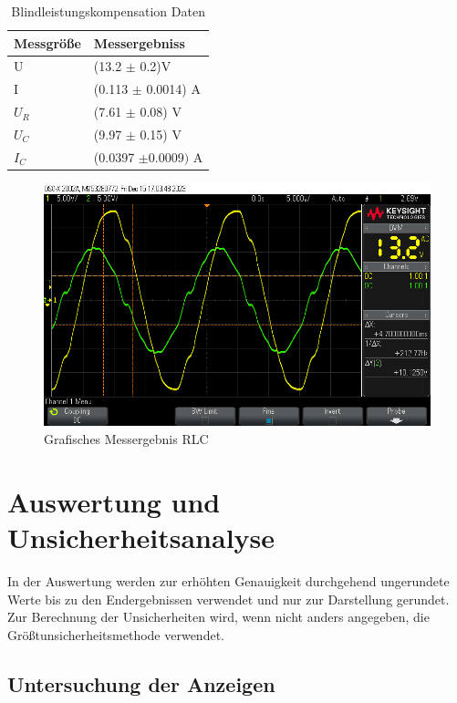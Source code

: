 \documentclass[12pt,a4paper,twoside]{article}
\begin{document}
\begin{table}[H]
    \centering
    \caption{Blindleistungskompensation Daten}
    \label{tab:Daten7}
    \begin{tabular}{| l | l |}
        \hline
        Messgröße & Messergebniss \\
        \hline
        U & (13.2 $\pm$ 0.2)V \\
        I & (0.113 $\pm$ 0.0014) A \\
        $U_{R}$ & (7.61 $\pm$ 0.08) V \\
        $U_{C}$ & (9.97 $\pm$ 0.15) V \\
        $I_{C}$ & (0.0397 $\pm 0.0009)$ A \\
        \hline
    \end{tabular}
\end{table}

\begin{figure}[H]
    \centering
    \includegraphics[width=0.6\linewidth]{nudes/PhaseLeistung/Aufgabe7/scope_14.png}
    \caption{Grafisches Messergebnis RLC}
    \label{fig:MessergebnisGrafischRLC}
\end{figure}




\section{Auswertung und Unsicherheitsanalyse} %

In der Auswertung werden zur erhöhten Genauigkeit durchgehend ungerundete Werte bis zu den Endergebnissen verwendet und nur zur Darstellung gerundet. \\
Zur Berechnung der Unsicherheiten wird, wenn nicht anders angegeben, die Größtunsicherheitsmethode verwendet.

\subsection{Untersuchung der Anzeigen}
\end{document}
